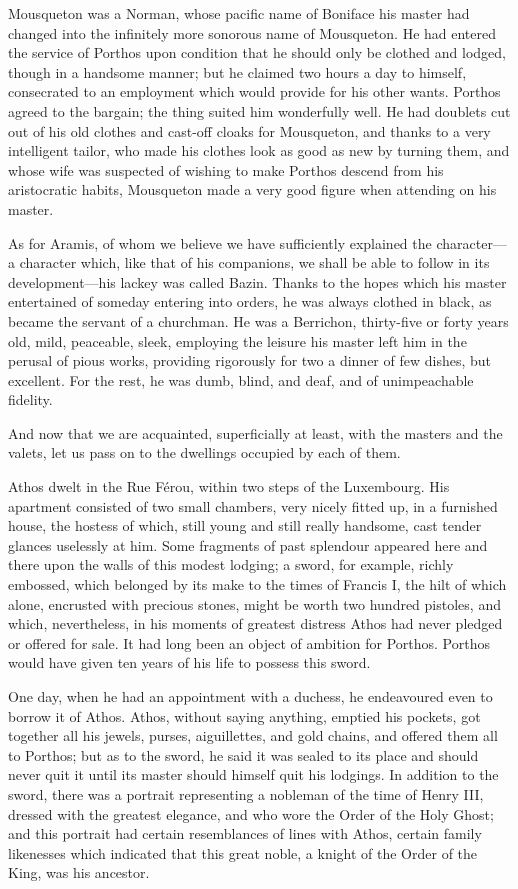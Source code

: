Mousqueton was a Norman, whose pacific name of Boniface his master had changed into the infinitely more sonorous name of Mousqueton. He had entered the service of Porthos upon condition that he should only be clothed and lodged, though in a handsome manner; but he claimed two hours a day to himself, consecrated to an employment which would provide for his other wants. Porthos agreed to the bargain; the thing suited him wonderfully well. He had doublets cut out of his old clothes and cast-off cloaks for Mousqueton, and thanks to a very intelligent tailor, who made his clothes look as good as new by turning them, and whose wife was suspected of wishing to make Porthos descend from his aristocratic habits, Mousqueton made a very good figure when attending on his master. 

As for Aramis, of whom we believe we have sufficiently explained the character—a character which, like that of his companions, we shall be able to follow in its development—his lackey was called Bazin. Thanks to the hopes which his master entertained of someday entering into orders, he was always clothed in black, as became the servant of a churchman. He was a Berrichon, thirty-five or forty years old, mild, peaceable, sleek, employing the leisure his master left him in the perusal of pious works, providing rigorously for two a dinner of few dishes, but excellent. For the rest, he was dumb, blind, and deaf, and of unimpeachable fidelity. 

And now that we are acquainted, superficially at least, with the masters and the valets, let us pass on to the dwellings occupied by each of them. 

Athos dwelt in the Rue Férou, within two steps of the Luxembourg. His apartment consisted of two small chambers, very nicely fitted up, in a furnished house, the hostess of which, still young and still really handsome, cast tender glances uselessly at him. Some fragments of past splendour appeared here and there upon the walls of this modest lodging; a sword, for example, richly embossed, which belonged by its make to the times of Francis I, the hilt of which alone, encrusted with precious stones, might be worth two hundred pistoles, and which, nevertheless, in his moments of greatest distress Athos had never pledged or offered for sale. It had long been an object of ambition for Porthos. Porthos would have given ten years of his life to possess this sword. 

One day, when he had an appointment with a duchess, he endeavoured even to borrow it of Athos. Athos, without saying anything, emptied his pockets, got together all his jewels, purses, aiguillettes, and gold chains, and offered them all to Porthos; but as to the sword, he said it was sealed to its place and should never quit it until its master should himself quit his lodgings. In addition to the sword, there was a portrait representing a nobleman of the time of Henry III, dressed with the greatest elegance, and who wore the Order of the Holy Ghost; and this portrait had certain resemblances of lines with Athos, certain family likenesses which indicated that this great noble, a knight of the Order of the King, was his ancestor. 

